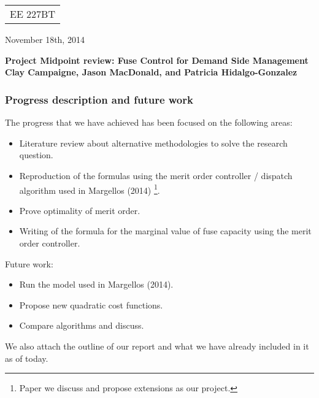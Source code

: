 \documentclass[letter,12pt]{article}
\begin{document}
\part{}

{\parindent 0pt \begin{tabular}[t]{l}
EE 227BT \\
\end{tabular}  \hfill November 18th, 2014 \vskip 0.2in }

\parindent 0pt
\parskip 8pt


\begin{center}
\small\bf \LARGE Project Midpoint review: Fuse Control for Demand Side Management\\
\smallskip
\small \textnormal{Clay Campaigne, Jason MacDonald, and Patricia Hidalgo-Gonzalez}\\
\end{center}

\bigskip

\section{Progress description and future work}

The progress that we have achieved has been focused on the following areas:
\begin{itemize}
\item Literature review about alternative methodologies to solve the research question.
\item Reproduction of the formulas using the merit order controller / dispatch algorithm used in Margellos (2014) \footnote{Paper we discuss and propose extensions as our project.}.
\item Prove optimality of merit order.
\item Writing of the formula for the marginal value of fuse capacity using the merit order controller.
\end{itemize}

Future work:
\begin{itemize}
\item Run the model used in Margellos (2014).
\item Propose new quadratic cost functions.
\item Compare algorithms and discuss.
\end{itemize}
We also attach the outline of our report and what we have already included in it as of today.

\newpage
\end{document}
